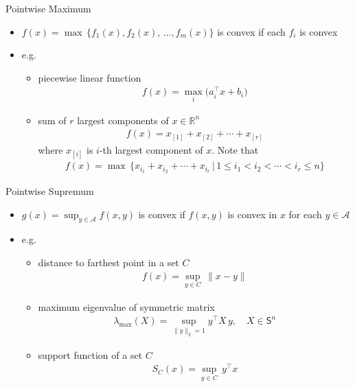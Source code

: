 \documentclass[10pt]{beamer}
\newcommand{\ds}{\displaystyle}
\theoremstyle{definition}
\begin{document}
\begin{frame}{Pointwise Maximum}
  \begin{itemize}
    \item $\ds f(x) = \max\,\{f_1(x),f_2(x),\,\ldots,f_m(x)\}$ is convex if each $f_i$ is convex
    \item e.g.
      \begin{itemize}
        \item piecewise linear function
          \begin{align*}
            f(x) = \max_i\big(a_i^\top x + b_i\big)
          \end{align*}
        \item sum of $r$ largest components of $x\in\mathbb{R}^n$  
          \begin{align*}
            f(x) = x_{[1]} + x_{[2]} + \cdots + x_{[r]}
          \end{align*}
          where $x_{[i]}$ is $i$-th largest component of $x$. Note that
          \begin{align*}
            f(x) = \max\,\{x_{i_1} + x_{i_2} + \cdots + x_{i_r}\,|\,1\leqslant i_1 < i_2 < \cdots < i_r\leqslant n\}
          \end{align*}
      \end{itemize}
  \end{itemize}
\end{frame}

\begin{frame}{Pointwise Supremum}
  \begin{itemize}
    \item $\ds g(x) = \sup_{y\in\mathcal{A}}f(x, y)$ is convex if $f(x, y)$ is convex in $x$ for each $y\in\mathcal{A}$
    \item e.g.
      \begin{itemize}
        \item distance to farthest point in a set $C$
          \begin{align*}
            f(x) = \sup_{y\in C}\,\|x - y\|
          \end{align*}
        \item maximum eigenvalue of symmetric matrix 
          \begin{align*}
            \lambda_{\text{max}}(X) = \sup_{\|y\|_2 = 1} y^\top X\,y, \quad X\in\mathsf{S}^n 
          \end{align*}
        \item support function of a set $C$
          \begin{align*}
            S_C(x) = \sup_{y\in C}\,y^\top x
          \end{align*}
      \end{itemize}
  \end{itemize}
\end{frame}
\end{document}
